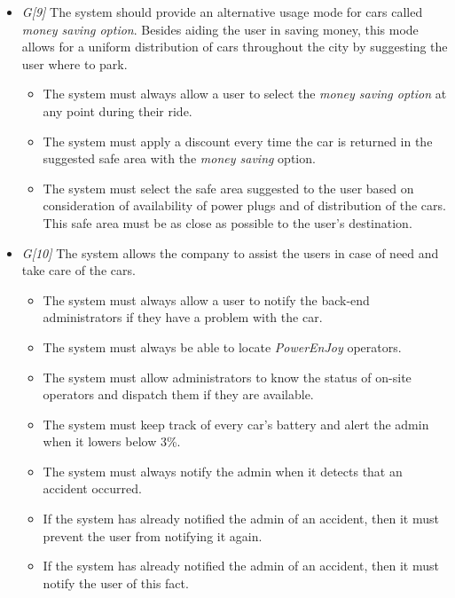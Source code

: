 \begin{itemize}
				\item \textit{G[9]} The system should provide an alternative usage mode for cars called \textit{money saving option}. Besides aiding the user in saving money, this mode allows for a uniform distribution of cars throughout the city by suggesting the user where to park.
					\begin{itemize}
						\item The system must always allow a user to select the \textit{money saving option} at any point during their ride. 
						\item The system must apply a discount every time the car is returned in the suggested safe area with the \textit{money saving} option.
						\item The system must select the safe area suggested to the user based on consideration of availability of power plugs and of distribution of the cars. This safe area must be as close as possible to the user's destination. %
					\end{itemize}
					
				\item \textit{G[10]} The system allows the company to assist the users in case of need and take care of the cars.	
					\begin{itemize}
						\item The system must always allow a user to notify the back-end administrators if they have a problem with the car.
						\item The system must always be able to locate \textit{PowerEnJoy} operators. 
						\item The system must allow administrators to know the status of on-site operators and dispatch them if they are available.
						\item The system must keep track of every car's battery and alert the admin when it lowers below 3\%. 
						\item The system must always notify the admin when it detects that an accident occurred. 
						\item If the system has already notified the admin of an accident, then it must prevent the user from notifying it again.
						\item If the system has already notified the admin of an accident, then it must notify the user of this fact.
					\end{itemize}
					

\end{itemize}
